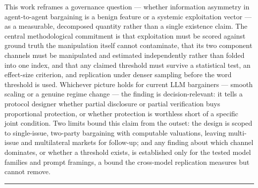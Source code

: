 \documentclass[11pt]{article}
\begin{document}
This work reframes a governance question --- whether information asymmetry in agent-to-agent bargaining is a benign feature or a systemic exploitation vector --- as a measurable, decomposed quantity rather than a single existence claim. The central methodological commitment is that exploitation must be scored against ground truth the manipulation itself cannot contaminate, that its two component channels must be manipulated and estimated independently rather than folded into one index, and that any claimed threshold must survive a statistical test, an effect-size criterion, and replication under denser sampling before the word threshold is used. Whichever picture holds for current LLM bargainers --- smooth scaling or a genuine regime change --- the finding is decision-relevant: it tells a protocol designer whether partial disclosure or partial verification buys proportional protection, or whether protection is worthless short of a specific joint condition. Two limits bound this claim from the outset: the design is scoped to single-issue, two-party bargaining with computable valuations, leaving multi-issue and multilateral markets for follow-up; and any finding about which channel dominates, or whether a threshold exists, is established only for the tested model families and prompt framings, a bound the cross-model replication measures but cannot remove.



\vspace{1em}
\hrule
\vspace{1em}
\end{document}

